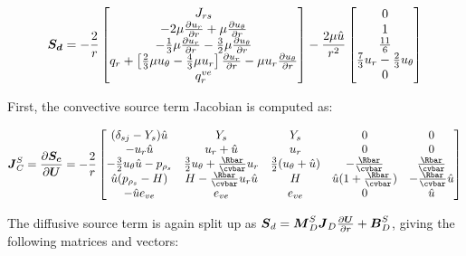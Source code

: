 \documentclass[10pt]{article}
\begin{document}
\begin{flushleft}
\begin{equation*}
    \boldsymbol{S_d} = -\frac{2}{r}
    \begin{bmatrix}
    J_{rs} \\ -2 \mu \frac{\partial u_r}{\partial r} + \mu \frac{\partial u_\theta}{\partial r} \\ -\frac{1}{3} \mu \frac{\partial u_r}{\partial r} - \frac{3}{2} \mu \frac{\partial u_\theta}{\partial r} \\ q_r + \left[ \frac{2}{3} \mu u_\theta -\frac{4}{3} \mu u_r \right] \frac{\partial u_r}{\partial r} - \mu u_r \frac{\partial u_\theta}{\partial r} \\ q_r^{ve}   
    \end{bmatrix}
    - \frac{2 \mu \hat{u}}{r^2}     
    \begin{bmatrix}
        0 \\ 1 \\ \frac{11}{6} \\ \frac{7}{3} u_r - \frac{2}{3} u_\theta \\ 0
    \end{bmatrix}
\end{equation*}

First, the convective source term Jacobian is computed as:

\begin{equation*}
    \boldsymbol{J}_C^S = \pd{\boldsymbol{S_c}}{\boldsymbol{U}} = -\frac{2}{r}
    \begin{bmatrix}
    (\delta_{sj} - Y_s) \hat{u} & Y_s & Y_s & 0 & 0 \\
    -u_r \hat{u} & u_r + \hat{u} & u_r & 0 & 0 \\
    -\frac{3}{2} u_\theta \hat{u} - p_{\rho_s} & \frac{3}{2} u_\theta + \frac{\Rbar}{\cvbar} u_r & \frac{3}{2} (u_\theta + \hat{u}) & -\frac{\Rbar}{\cvbar} & \frac{\Rbar}{\cvbar} \\
    \hat{u} (p_{\rho_s} - H) & H - \frac{\Rbar}{\cvbar} u_r \hat{u} & H & \hat{u} (1 +\frac{\Rbar}{\cvbar}) & -\frac{\Rbar}{\cvbar} \hat{u} \\    
    - \hat{u} e_{ve} & e_{ve} & e_{ve} & 0 & \hat{u}
    \end{bmatrix}
\end{equation*}

The diffusive source term is again   split up as $\boldsymbol{S}_d = \boldsymbol{M}_D^S \boldsymbol{J}_D \frac{\partial \boldsymbol{U}}{\partial r} + \boldsymbol{B}_D^S$, giving the following matrices and vectors:


\end{flushleft}
\end{document}
